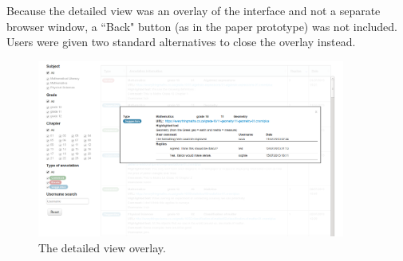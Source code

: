 Because the detailed view was an overlay of the interface and not a separate browser window, a ``Back" button (as in the paper prototype) was not included. Users were given two standard alternatives to close the overlay instead. 

\begin{figure}[h!]
    \centering
    \includegraphics[width=0.9\textwidth]{Figures/V1/detailedview.png}
 \caption{The detailed view overlay.}

\end{figure}

